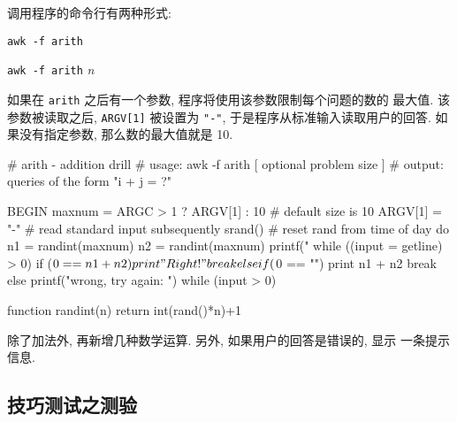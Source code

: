 调用程序的命令行有两种形式:
\begin{pattern}
    \indent\texttt{awk -f arith} \par
    \indent\texttt{awk -f arith} \textit{n}
\end{pattern}
如果在 \texttt{arith} 之后有一个参数, 程序将使用该参数限制每个问题的数的
最大值. 该参数被读取之后, \texttt{ARGV[1]} 被设置为 \texttt{"-"},
于是程序从标准输入读取用户的回答. 如果没有指定参数, 那么数的最大值就是
10.
\begin{awkcode}
    # arith - addition drill
    #   usage:  awk -f arith [ optional problem size ]
    #   output: queries of the form "i + j = ?"

    BEGIN {
        maxnum = ARGC > 1 ? ARGV[1] : 10   # default size is 10
        ARGV[1] = "-"  # read standard input subsequently
        srand()        # reset rand from time of day
        do {
            n1 = randint(maxnum)
            n2 = randint(maxnum)
            printf("%
            while ((input = getline) > 0)
                if ($0 == n1 + n2) {
                    print "Right!"
                    break
                } else if ($0 == "") {
                    print n1 + n2
                    break
                } else
                    printf("wrong, try again: ")
        } while (input > 0)
    }

    function randint(n) { return int(rand()*n)+1 }
\end{awkcode}

\begin{exercise}
    除了加法外, 再新增几种数学运算. 另外, 如果用户的回答是错误的, 显示
    一条提示信息.
\end{exercise}

\subsection{技巧测试之测验}
\label{subsec:skills_testing_quiz}


